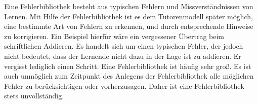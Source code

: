 Eine Fehlerbibliothek besteht aus typischen Fehlern und Missverständnissen von Lernen.
Mit Hilfe der Fehlerbibliothek ist es dem Tutorenmodell später möglich, eine bestimmte Art von
Fehlern zu erkennen, und durch entsprechende Hinweise zu korrigieren.
Ein Beispiel hierfür wäre ein vergessener Übertrag beim schriftlichen Addieren.
Es handelt sich um einen typischen Fehler, der jedoch nicht bedeutet, dass der Lernende nicht dazu in der Lage ist
zu addieren. Er vergisst lediglich einen Schritt.
Eine Fehlerbibliothek ist häufig sehr groß. Es ist auch unmöglich zum Zeitpunkt des Anlegens der Fehlerbibliothek
alle möglichen Fehler zu berücksichtigen oder vorherzusagen. Daher ist eine Fehlerbibliothek stets unvollständig.

